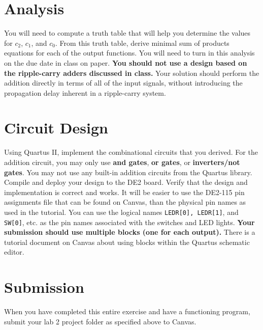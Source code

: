 \documentclass[10pt]{article}
\begin{document}
\section*{Analysis}

You will need to compute a truth table that will help you determine
the values for $c_2$, $c_1$, and $c_0$. From this truth table, derive
minimal sum of products equations for each of the output functions.
You will need to turn in this analysis on the due date in class on
paper. {\bf You should not use a design based on the ripple-carry
  adders discussed in class.} Your solution should perform the
addition directly in terms of all of the input signals, without
introducing the propagation delay inherent in a ripple-carry system.

\section*{Circuit Design}

Using Quartus II, implement the combinational circuits that you
derived. For the addition circuit, you may only use {\bf and gates}, {\bf or
gates}, or {\bf inverters/not gates}. You may not use any built-in addition circuits
from the Quartus library. Compile and deploy your design to the DE2
board.  Verify that the design and implementation is correct and
works. It will be easier to use the DE2-115 pin assignments file that
can be found on Canvas, than the physical pin names as used in the
tutorial. You can use the logical names {\tt LEDR[0], LEDR[1]}, and
{\tt SW[0]}, etc. as the pin names associated with the switches and
LED lights. {\bf Your submission should use multiple blocks (one for
  each output).} There is a tutorial document on Canvas about using
blocks within the Quartus schematic editor.



\section*{Submission}

When you have completed this entire exercise and have a functioning
program, submit your lab 2 project folder as specified above to Canvas.
\end{document}
